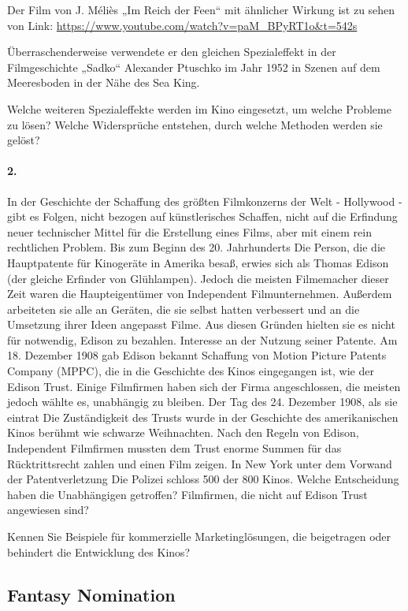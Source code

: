 \documentclass[11pt,a4paper]{article}
\begin{document}
Der Film von J. Méliès „Im Reich der Feen“ mit ähnlicher Wirkung ist zu sehen
von Link: \url{https://www.youtube.com/watch?v=paM_BPyRT1o&t=542s}

Überraschenderweise verwendete er den gleichen Spezialeffekt in der
Filmgeschichte „Sadko“ Alexander Ptuschko im Jahr 1952 in Szenen auf dem
Meeresboden in der Nähe des Sea King.

Welche weiteren Spezialeffekte werden im Kino eingesetzt, um welche Probleme
zu lösen? Welche Widersprüche entstehen, durch welche Methoden werden sie
gelöst?

\paragraph{2.}
In der Geschichte der Schaffung des größten Filmkonzerns der Welt - Hollywood
- gibt es Folgen, nicht bezogen auf künstlerisches Schaffen, nicht auf die
Erfindung neuer technischer Mittel für die Erstellung eines Films, aber mit
einem rein rechtlichen Problem. Bis zum Beginn des 20. Jahrhunderts Die
Person, die die Hauptpatente für Kinogeräte in Amerika besaß, erwies sich als
Thomas Edison (der gleiche Erfinder von Glühlampen). Jedoch die meisten
Filmemacher dieser Zeit waren die Haupteigentümer von Independent
Filmunternehmen. Außerdem arbeiteten sie alle an Geräten, die sie selbst
hatten verbessert und an die Umsetzung ihrer Ideen angepasst Filme. Aus diesen
Gründen hielten sie es nicht für notwendig, Edison zu bezahlen.  Interesse an
der Nutzung seiner Patente. Am 18. Dezember 1908 gab Edison bekannt Schaffung
von Motion Picture Patents Company (MPPC), die in die Geschichte des Kinos
eingegangen ist, wie der Edison Trust. Einige Filmfirmen haben sich der Firma
angeschlossen, die meisten jedoch wählte es, unabhängig zu bleiben. Der Tag
des 24. Dezember 1908, als sie eintrat Die Zuständigkeit des Trusts wurde in
der Geschichte des amerikanischen Kinos berühmt wie schwarze Weihnachten. Nach
den Regeln von Edison, Independent Filmfirmen mussten dem Trust enorme Summen
für das Rücktrittsrecht zahlen und einen Film zeigen. In New York unter dem
Vorwand der Patentverletzung Die Polizei schloss 500 der 800 Kinos. Welche
Entscheidung haben die Unabhängigen getroffen?  Filmfirmen, die nicht auf
Edison Trust angewiesen sind?

Kennen Sie Beispiele für kommerzielle Marketinglösungen, die beigetragen oder
behindert die Entwicklung des Kinos?

\subsection*{Fantasy Nomination}
\end{document}
